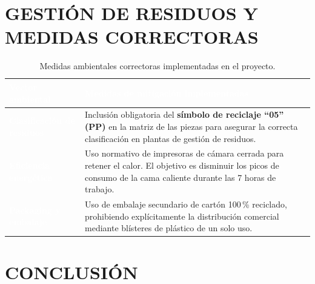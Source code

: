 \documentclass[11pt,a4paper]{article}
\begin{document}
\section{GESTIÓN DE RESIDUOS Y MEDIDAS CORRECTORAS}

\begin{table}[H]
    \centering
    \small
    \renewcommand{\arraystretch}{1.6}
    \renewcommand{\tabularxcolumn}[1]{m{#1}}
    \begin{tabularx}{\linewidth}{|>{\raggedright\arraybackslash}m{4.5cm}|X|}
        \hline
        \rowcolor{ArthroNavy}
        \textcolor{white}{\textbf{Vector ambiental}} & 
        \textcolor{white}{\textbf{Medidas de mitigación implementadas}} \\ 
        \hline
        
        \cellcolor{ArthroNavy}\textcolor{white}{\textbf{Clasificación de residuos}} & 
        \cellcolor{ArthroTeal!5}
        Inclusión obligatoria del \textbf{símbolo de reciclaje ``05'' (PP)} en la matriz de las piezas para asegurar la correcta clasificación en plantas de gestión de residuos. \\ 
        \hline
        
        \cellcolor{ArthroNavy}\textcolor{white}{\textbf{Eficiencia energética}} & 
        Uso normativo de impresoras de cámara cerrada para retener el calor. El objetivo es disminuir los picos de consumo de la cama caliente durante las 7 horas de trabajo. \\ 
        \hline
        
        \cellcolor{ArthroNavy}\textcolor{white}{\textbf{Packaging y embalaje}} & 
        \cellcolor{ArthroTeal!5}
        Uso de embalaje secundario de cartón 100\,\% reciclado, prohibiendo explícitamente la distribución comercial mediante blísteres de plástico de un solo uso. \\ 
        \hline
    \end{tabularx}
    \caption{Medidas ambientales correctoras implementadas en el proyecto.}
    \label{tab:medidas_ambientales}
\end{table}

\newpage
\section{CONCLUSIÓN}
\end{document}

